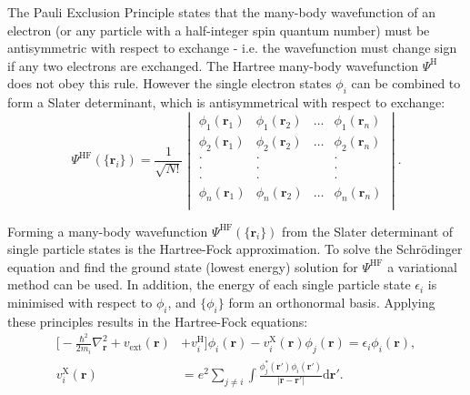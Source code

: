 The Pauli Exclusion Principle states that the many-body wavefunction of an electron (or any particle with a half-integer spin quantum number) must be antisymmetric with respect to exchange - i.e. the wavefunction must change sign if any two electrons are exchanged.\autocite{Kaxiras2007} The Hartree many-body wavefunction $\Psi^{\textrm{H}}$ does not obey this rule. However the single electron states $\phi_i$ can be combined to form a Slater determinant,\autocite{Slater1929} which is antisymmetrical with respect to exchange:
\begin{equation} \label{slaterdet}
\Psi^{\textrm{HF}}(\{\textbf{r}_i\}) = \frac{1}{\sqrt{N!}}
\begin{vmatrix}
\phi_1(\textbf{r}_1)&\phi_1(\textbf{r}_2)&\ldots&\phi_1(\textbf{r}_n) \\
\phi_2(\textbf{r}_1)&\phi_2(\textbf{r}_2)&\ldots&\phi_2(\textbf{r}_n) \\
\cdot & \cdot & & \cdot \\
\cdot & \cdot & & \cdot \\
\cdot & \cdot & & \cdot \\
\phi_n(\textbf{r}_1)&\phi_n(\textbf{r}_2)&\ldots&\phi_n(\textbf{r}_n) \\
\end{vmatrix}.
\end{equation}

Forming a many-body wavefunction $\Psi^{\textrm{HF}}(\{\textbf{r}_i\})$ from the Slater determinant of single particle states is the Hartree-Fock approximation. To solve the Schr\"{o}dinger equation and find the ground state (lowest energy) solution for $\Psi^{\textrm{HF}}$ a variational method can be used.\autocite{Fock1930} In addition, the energy of each single particle state $\epsilon_i$ is minimised with respect to $\phi_i$, and $\{\phi_i\}$ form an orthonormal basis. Applying these principles results in the Hartree-Fock equations:\autocite{Fock1930}
\begin{align}
\bigg[-\frac{\hbar^2}{2m_i}\nabla_{\textbf{r}}^2  + v_\mathrm{ext}(\textbf{r}) &+ v_i^\textrm{H}\bigg]\phi_i(\mathbf{r})-v_i^\textrm{X}(\mathbf{r})\phi_j(\mathbf{r}) = \epsilon_i\phi_i(\mathbf{r}), \\
v_i^\textrm{X}(\mathbf{r}) &= e^2\sum_{j\neq i}\int \frac{\phi_j^*(\mathbf{r}')\phi_i(\mathbf{r}')}{\lvert\mathbf{r}-\mathbf{r}'\rvert}\textrm{d}\mathbf{r}'.
\end{align}

